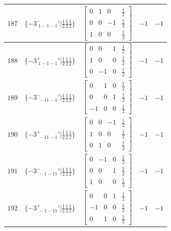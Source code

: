 \documentclass[fleqn,8pt]{jsarticle}
\begin{document}
\begin{longtable}{ccccc}
$ 187 $ & $ \{-3^{-}_{\,\,1-1-1}{}'|\frac{1}{2} \frac{1}{2} \frac{1}{2}\} $ & $ \begin{bmatrix} 0 & 1 & 0 & \frac{1}{2} \\ 0 & 0 & -1 & \frac{1}{2} \\ 1 & 0 & 0 & \frac{1}{2} \end{bmatrix} $ & $ -1 $ & $ -1 $ \\ \hline
$ 188 $ & $ \{-3^{+}_{\,\,1-1-1}{}'|\frac{1}{2} \frac{1}{2} \frac{1}{2}\} $ & $ \begin{bmatrix} 0 & 0 & 1 & \frac{1}{2} \\ 1 & 0 & 0 & \frac{1}{2} \\ 0 & -1 & 0 & \frac{1}{2} \end{bmatrix} $ & $ -1 $ & $ -1 $ \\ \hline
$ 189 $ & $ \{-3^{-}_{\,\,-11-1}{}'|\frac{1}{2} \frac{1}{2} \frac{1}{2}\} $ & $ \begin{bmatrix} 0 & 1 & 0 & \frac{1}{2} \\ 0 & 0 & 1 & \frac{1}{2} \\ -1 & 0 & 0 & \frac{1}{2} \end{bmatrix} $ & $ -1 $ & $ -1 $ \\ \hline
$ 190 $ & $ \{-3^{+}_{\,\,-11-1}{}'|\frac{1}{2} \frac{1}{2} \frac{1}{2}\} $ & $ \begin{bmatrix} 0 & 0 & -1 & \frac{1}{2} \\ 1 & 0 & 0 & \frac{1}{2} \\ 0 & 1 & 0 & \frac{1}{2} \end{bmatrix} $ & $ -1 $ & $ -1 $ \\ \hline
$ 191 $ & $ \{-3^{-}_{\,\,-1-11}{}'|\frac{1}{2} \frac{1}{2} \frac{1}{2}\} $ & $ \begin{bmatrix} 0 & -1 & 0 & \frac{1}{2} \\ 0 & 0 & 1 & \frac{1}{2} \\ 1 & 0 & 0 & \frac{1}{2} \end{bmatrix} $ & $ -1 $ & $ -1 $ \\ \hline
$ 192 $ & $ \{-3^{+}_{\,\,-1-11}{}'|\frac{1}{2} \frac{1}{2} \frac{1}{2}\} $ & $ \begin{bmatrix} 0 & 0 & 1 & \frac{1}{2} \\ -1 & 0 & 0 & \frac{1}{2} \\ 0 & 1 & 0 & \frac{1}{2} \end{bmatrix} $ & $ -1 $ & $ -1 $ \\
\end{longtable}
\end{document}
